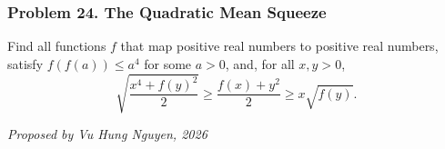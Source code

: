 \subsubsection*{Problem 24. The Quadratic Mean Squeeze}

\begin{exercisebox}[hard]

Find all functions $f$ that map positive real numbers to positive real
numbers, satisfy $f(f(a))\leq a^4$ for some $a>0$, and, for all
$x,y>0$,
\[
\sqrt{\frac{x^4+f(y)^2}{2}}
\geq\frac{f(x)+y^2}{2}
\geq x\sqrt{f(y)}.
\]

\begin{flushright}
\textit{Proposed by Vu Hung Nguyen, 2026}
\end{flushright}


\end{exercisebox}